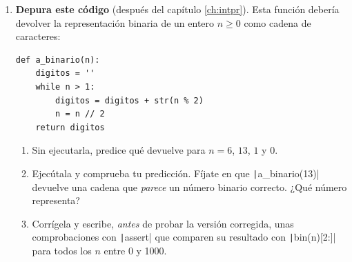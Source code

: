 \begin{enumerate}
\begin{quote}
\emph{``Para pasar $0.375$ a binario lo multiplicamos sucesivamente por 2: $0.75$ (parte entera 0), $1.5$ (parte entera 1) y, quitando la parte entera, $1.0$ (parte entera 1). Igual que con los enteros, leemos las partes enteras de abajo arriba, así que $0.375 = 0.110$ en binario. En general, un número con tres cifras decimales tiene como mucho tres cifras binarias, así que $0.1$ también se representa exactamente.''}
\end{quote}
Encuentra los dos errores. Comprueba tu representación de $0.375$ deshaciendo el cambio, y calcula qué número representa en realidad $0.110$.

\item \label{ej:intro_depura} \textbf{Depura este código} (después del capítulo \ref{ch:intpr}). Esta función debería devolver la representación binaria de un entero $n\geq0$ como cadena de caracteres:
\begin{verbatim}
def a_binario(n):
    digitos = ''
    while n > 1:
        digitos = digitos + str(n % 2)
        n = n // 2
    return digitos
\end{verbatim}
\begin{enumerate}
\item Sin ejecutarla, predice qué devuelve para $n=6$, $13$, $1$ y $0$.
\item Ejecútala y comprueba tu predicción. Fíjate en que \texttt|a_binario(13)| devuelve una cadena que \emph{parece} un número binario correcto. ¿Qué número representa?
\item Corrígela y escribe, \emph{antes} de probar la versión corregida, unas comprobaciones con \texttt|assert| que comparen su resultado con \texttt|bin(n)[2:]| para todos los $n$ entre 0 y 1000.
\end{enumerate}
\end{enumerate}

